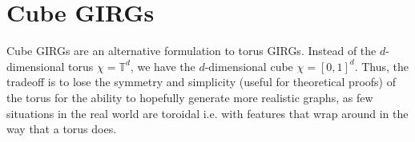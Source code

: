 










\section{Cube GIRGs}

Cube GIRGs are an alternative formulation to torus GIRGs. Instead of the $d$-dimensional torus $\chi = \mathbb{T}^d$, we have the $d$-dimensional cube $\chi = [0,1]^d$. Thus, the tradeoff is to lose the symmetry and simplicity (useful for theoretical proofs) of the torus for the ability to hopefully generate more realistic graphs, as few situations in the real world are toroidal i.e. with features that wrap around in the way that a torus does.

